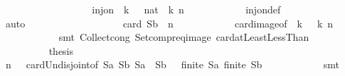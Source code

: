 \begin{isabellebody}
\isanewline
\ \ \ \ \ \ \ \ \isamarkupfalse%
\isanewline
\isanewline
\ \ \ \ \ \ \ \ \isamarkupfalse%
\ {\isachardoublequoteopen}inj{\isacharunderscore}on\ {\isacharparenleft}{\isasymlambda}\ k{\isachardot}\ {}\ {\isacharasterisk}\ {\isacharparenleft}{}{\isacharcolon}{\isacharcolon}nat{\isacharparenright}\ {\isacharcircum}\ k{\isacharparenright}\ {\isacharbraceleft}{}{\isachardot}{\isachardot}{\isacharless}n{\isacharbraceright}{\isachardoublequoteclose}\isanewline
\ \ \ \ \ \ \ \ \ \ \isamarkupfalse%
\ inj{\isacharunderscore}on{\isacharunderscore}def\isanewline
\ \ \ \ \ \ \ \ \ \ \isamarkupfalse%
\ auto\isanewline
\ \ \ \ \ \ \ \isanewline
\ \ \ \ \ \ \ \ \isamarkupfalse%
\ \isamarkupfalse%
\ {\isachardoublequoteopen}card\ {\isacharquery}Sb\ {\isacharequal}\ n{\isacharminus}{}{\isachardoublequoteclose}\isanewline
\ \ \ \ \ \ \ \ \ \ \isamarkupfalse%
\ card{\isacharunderscore}image{\isacharbrackleft}of\ {\isachardoublequoteopen}{\isasymlambda}\ k{\isachardot}\ {}\ {\isacharasterisk}\ {}{\isacharcircum}k{\isachardoublequoteclose}\ {\isachardoublequoteopen}{\isacharbraceleft}{}{\isachardot}{\isachardot}{\isacharless}n{\isacharbraceright}{\isachardoublequoteclose}{\isacharbrackright}\isanewline
\ \ \ \ \ \ \ \ \ \ \isamarkupfalse%
\ {\isacharparenleft}smt\ Collect{\isacharunderscore}cong\ Setcompr{\isacharunderscore}eq{\isacharunderscore}image\ card{\isacharunderscore}atLeastLessThan{\isacharparenright}\isanewline
\isanewline
\isanewline
\ \ \ \ \ \ \ \ \isamarkupfalse%
\isanewline
\ \ \ \ \ \ \ \ \isamarkupfalse%
\ {\isacharquery}thesis\isanewline
\ \ \ \ \ \ \ \ \ \ \isamarkupfalse%
\ {\isacharbackquoteopen}n\ {\isasymge}\ {}{\isacharbackquoteclose}\ card{\isacharunderscore}Un{\isacharunderscore}disjoint{\isacharbrackleft}of\ {\isacharquery}Sa\ {\isacharquery}Sb{\isacharbrackright}\ {\isacharbackquoteopen}{\isacharquery}Sa\ {\isasyminter}\ {\isacharquery}Sb\ {\isacharequal}\ {\isacharbraceleft}{\isacharbraceright}{\isacharbackquoteclose}\ {\isacharbackquoteopen}finite\ {\isacharquery}Sa{\isacharbackquoteclose}\ {\isacharbackquoteopen}finite\ {\isacharquery}Sb{\isacharbackquoteclose}\isanewline
\ \ \ \ \ \ \ \ \ \ \isamarkupfalse%
\ smt\isanewline
\ \ \ \ \ \ \isamarkupfalse%
\isanewline
\isanewline
\ \ \ \ \ \ \isamarkupfalse%

\end{isabellebody}
